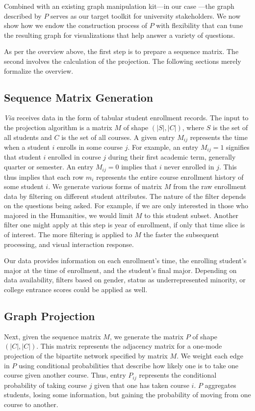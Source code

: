 \documentclass{sigchi}
\begin{document}
Combined with an existing graph manipulation kit---in our case
\cite{shannon2003cytoscape}---the graph described by $P$ serves as our
target toolkit for university stakeholders. We now show how we endow
the construction process of $P$ with flexibility that can tune the
resulting graph for visualizations that help answer a variety of
questions.

As per the overview above, the first step is to prepare a sequence
matrix. The second involves the calculation of the projection. The
following sections merely formalize the overview.

\subsection{Sequence Matrix Generation}
\label{sec:seq_martix}

{\em Via} receives data in the form of tabular student enrollment
records. The input to the projection algorithm is a matrix $M$ of
shape $(|S|, |C|)$, where $S$ is the set of all students and $C$ is
the set of all courses. A given entry $M_{ij}$ represents the time
when a student $i$ enrolls in some course $j$. For example, an entry
$M_{ij} = 1$ signifies that student $i$ enrolled in course $j$ during
their first academic term, generally quarter or semester. An entry
$M_{ij} = 0$ implies that $i$ never enrolled in $j$. This thus implies
that each row $m_i$ represents the entire course enrollment history of
some student $i$. We generate various forms of matrix $M$ from the raw
enrollment data by filtering on different student attributes. The
nature of the filter depends on the questions being asked. For
example, if we are only interested in those who majored in the Humanities, we would
limit $M$ to this student subset. Another filter one might apply at
this step is year of enrollment, if only that time slice is of
interest. The more filtering is applied to $M$ the faster the
subsequent processing, and visual interaction response.

Our data provides information on each enrollment's time, the enrolling
student's major at the time of enrollment, and the student's final
major. Depending on data availability, filters based on gender, status
as underrepresented minority, or college entrance scores could be
applied as well.

\subsection{Graph Projection}
\label{sec:graph_projection}
Next, given the sequence matrix $M$, we generate the matrix $P$ of
shape $(|C|, |C|)$. This matrix represents the adjacency matrix for a
one-mode projection of the bipartite network specified by matrix
$M$. We weight each edge in $P$ using conditional probabilities that
describe how likely one is to take one course given another
course. Thus, entry $P_{ij}$ represents the conditional probability of
taking course $j$ given that one has taken course $i$. $P$ aggregates
students, losing some information, but gaining the probability of moving from one course to another.
\end{document}
